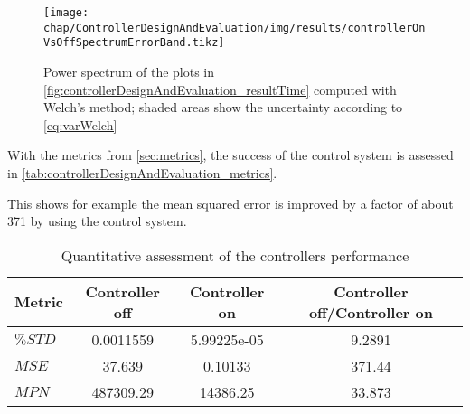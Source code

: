 \begin{figure}[tbh]
	\centering
	\texttt{[image: chap/ControllerDesignAndEvaluation/img/results/controllerOnVsOffSpectrumErrorBand.tikz]}
	\caption{Power spectrum of the plots in \autoref{fig:controllerDesignAndEvaluation_resultTime} computed with Welch's method; shaded areas show the uncertainty according to \autoref{eq:varWelch}}
	\label{fig:controllerDesignAndEvaluation_resultPeriodo}
\end{figure}

With the metrics from \autoref{sec:metrics}, the success of the control system is assessed in \autoref{tab:controllerDesignAndEvaluation_metrics}.

This shows for example the mean squared error is improved by a factor of about \num{371} by using the control system.

\begin{table}[tbh]
\centering
\caption{Quantitative assessment of the controllers performance}\label{tab:controllerDesignAndEvaluation_metrics}
\begin{tabular}{lSSS}
	\toprule
	Metric  & {Controller off} & {Controller on} & {Controller off/Controller on} \\ \midrule
	$\%STD$ & 0.0011559        & 5.99225e-05     & 9.2891                         \\
	$MSE$   & 37.639           & 0.10133         & 371.44                         \\
	$MPN$   & 487309.29        & 14386.25        & 33.873                         \\ \bottomrule
\end{tabular}
\end{table}














